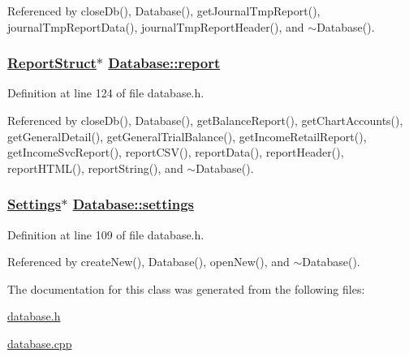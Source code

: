 Referenced by close\-Db(), Database(), get\-Journal\-Tmp\-Report(), journal\-Tmp\-Report\-Data(), journal\-Tmp\-Report\-Header(), and $\sim$Database().\hypertarget{classDatabase_r5}{
\subsubsection[report]{\setlength{\rightskip}{0pt plus 5cm}\hyperlink{structDatabase_1_1ReportStruct}{Report\-Struct}$\ast$ \hyperlink{classDatabase_r5}{Database::report}}}
\label{classDatabase_r5}


Definition at line 124 of file database.h.

Referenced by close\-Db(), Database(), get\-Balance\-Report(), get\-Chart\-Accounts(), get\-General\-Detail(), get\-General\-Trial\-Balance(), get\-Income\-Retail\-Report(), get\-Income\-Svc\-Report(), report\-CSV(), report\-Data(), report\-Header(), report\-HTML(), report\-String(), and $\sim$Database().\hypertarget{classDatabase_r0}{
\subsubsection[settings]{\setlength{\rightskip}{0pt plus 5cm}\hyperlink{classSettings}{Settings}$\ast$ \hyperlink{classDatabase_r0}{Database::settings}}}
\label{classDatabase_r0}


Definition at line 109 of file database.h.

Referenced by create\-New(), Database(), open\-New(), and $\sim$Database().

The documentation for this class was generated from the following files:\begin{CompactItemize}
\item 
\hyperlink{database_8h}{database.h}\item 
\hyperlink{database_8cpp}{database.cpp}\end{CompactItemize}
